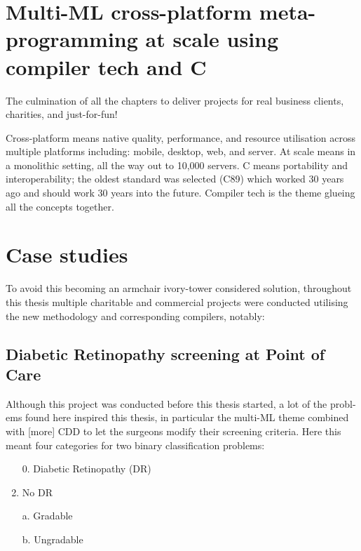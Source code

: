 \section{Multi-ML cross-platform meta-programming at scale using compiler tech and C}

The culmination of all the chapters to deliver projects for real business clients, charities, and just-for-fun!

Cross-platform means native quality, performance, and resource utilisation across multiple platforms including: mobile, desktop, web, and server. At scale means in a monolithic setting, all the way out to 10,000 servers. C means portability and interoperability; the oldest standard was selected (C89) which worked 30 years ago and should work 30 years into the future. Compiler tech is the theme glueing all the concepts together.

\section{Case studies}

To avoid this becoming an armchair ivory-tower considered solution, throughout this thesis multiple charitable and commercial projects were conducted utilising the new methodology and corresponding compilers, notably:

\subsection{Diabetic Retinopathy screening at Point of Care}

Although this project was conducted before this thesis started, a lot of the probl-\\ems found here inspired this thesis, in particular the multi-ML theme combined with [more] CDD to let the surgeons modify their screening criteria. Here this meant four categories for two binary classification problems:
\begin{enumerate}
    \item[0.] Diabetic Retinopathy (DR)
    \item No DR
    \item[a.] Gradable
    \item[b.] Ungradable
\end{enumerate}

